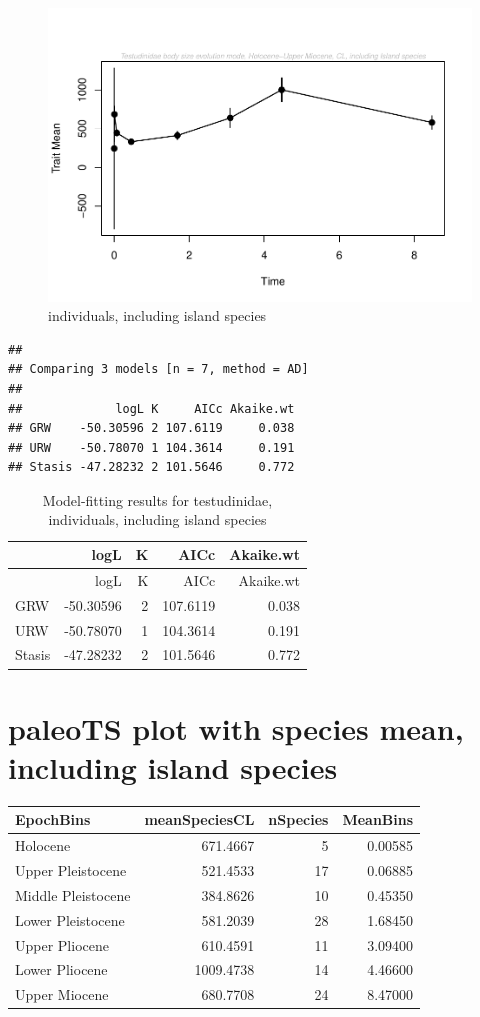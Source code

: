 \documentclass[]{article}
\begin{document}
\begin{figure}[htbp]
\centering
\includegraphics{MA_JJ_files/figure-latex/paleoTS plot-1.pdf}
\caption{individuals, including island species}
\end{figure}

\begin{verbatim}
## 
## Comparing 3 models [n = 7, method = AD]
## 
##             logL K     AICc Akaike.wt
## GRW    -50.30596 2 107.6119     0.038
## URW    -50.78070 1 104.3614     0.191
## Stasis -47.28232 2 101.5646     0.772
\end{verbatim}

\begin{longtable}[]{@{}lrrrr@{}}
\caption{Model-fitting results for testudinidae, individuals, including
island species}\tabularnewline
\toprule
& logL & K & AICc & Akaike.wt\tabularnewline
\midrule
\endfirsthead
\toprule
& logL & K & AICc & Akaike.wt\tabularnewline
\midrule
\endhead
GRW & -50.30596 & 2 & 107.6119 & 0.038\tabularnewline
URW & -50.78070 & 1 & 104.3614 & 0.191\tabularnewline
Stasis & -47.28232 & 2 & 101.5646 & 0.772\tabularnewline
\bottomrule
\end{longtable}

\section{paleoTS plot with species mean, including island
species}\label{paleots-plot-with-species-mean-including-island-species}

\begin{longtable}[]{@{}lrrr@{}}
\toprule
EpochBins & meanSpeciesCL & nSpecies & MeanBins\tabularnewline
\midrule
\endhead
Holocene & 671.4667 & 5 & 0.00585\tabularnewline
Upper Pleistocene & 521.4533 & 17 & 0.06885\tabularnewline
Middle Pleistocene & 384.8626 & 10 & 0.45350\tabularnewline
Lower Pleistocene & 581.2039 & 28 & 1.68450\tabularnewline
Upper Pliocene & 610.4591 & 11 & 3.09400\tabularnewline
Lower Pliocene & 1009.4738 & 14 & 4.46600\tabularnewline
Upper Miocene & 680.7708 & 24 & 8.47000\tabularnewline
\bottomrule
\end{longtable}
\end{document}
